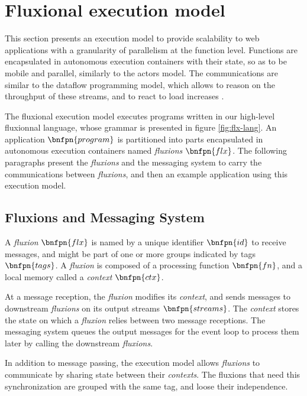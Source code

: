 \section{Fluxional execution model} \label{section:model}

This section presents an execution model to provide scalability to web applications with a granularity of parallelism at the function level.
Functions are encapsulated in autonomous execution containers with their state, so as to be mobile and parallel, similarly to the actors model.
The communications are similar to the dataflow programming model, which allows to reason on the throughput of these streams, and to react to load increases \cite{Bartenstein2014}.

The fluxional execution model executes programs written in our high-level fluxionnal language, whose grammar is presented in figure \ref{fig:flx-lang}.
An application $\bnfpn{program}$ is partitioned into parts encapsulated in autonomous execution containers named \textit{fluxions} $\bnfpn{flx}$.
The following paragraphs present the \textit{fluxions} and the messaging system to carry the communications between \textit{fluxions}, and then an example application using this execution model.

\subsection{Fluxions and Messaging System}

A \textit{fluxion} $\bnfpn{flx}$ is named by a unique identifier $\bnfpn{id}$ to receive messages, and might be part of one or more groups indicated by tags $\bnfpn{tags}$.
A \textit{fluxion} is composed of a processing function $\bnfpn{fn}$, and a local memory called a \textit{context} $\bnfpn{ctx}$.

At a message reception, the \textit{fluxion} modifies its \textit{context}, and sends messages to downstream \textit{fluxions} on its output streams $\bnfpn{streams}$.
The \textit{context} stores the state on which a \textit{fluxion} relies between two message receptions.
The messaging system queues the output messages for the event loop to process them later by calling the downstream \textit{fluxions}.

In addition to message passing, the execution model allows \textit{fluxions} to communicate by sharing state between their \textit{contexts}.
The fluxions that need this synchronization are grouped with the same tag, and loose their independence.

